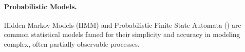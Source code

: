 \documentclass[10pt,reprint,nocopyrightspace,numbers]{sigplanconf}
\begin{document}



\paragraph{Probabilistic Models.}
Hidden Markov Models (HM\-M) and Probabilistic Finite State Automata (\pfsa) are 
common statistical models famed for their simplicity and accuracy in modeling complex,
often partially observable processes.
%
\end{document}
